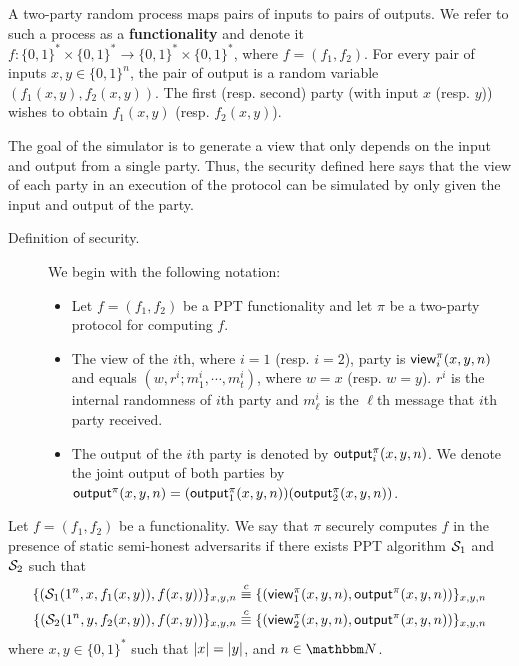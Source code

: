 \begin{definition} A two-party random process maps pairs of inputs to pairs of outputs. We refer to such a process as a {\bf functionality} and denote it $f:\{0,1\}^*\times\{0,1\}^*\to\{0,1\}^*\times\{0,1\}^*$, where $f=(f_1,f_2)$. For every pair of inputs $x,y\in\{0,1\}^n$, the pair of output is a random variable $(f_1(x,y),f_2(x,y))$. The first (resp. second) party (with input $x$ (resp. $y$)) wishes to obtain $f_1(x,y)$ (resp. $f_2(x,y)$).
\end{definition}
The goal of the simulator is to generate a view that only depends on the input and output from a single party. Thus, the security defined here says that the view of each party in an execution of the protocol can be simulated by only given the input and output of the party.
\begin{description}
\item[Definition of security.] We begin with the following notation:
\begin{itemize}[leftmargin=0em]
    \item Let $f=(f_1,f_2)$ be a PPT functionality and let $\pi$ be a two-party protocol for computing $f$.
    \item The view of the $i$th, where $i=1$ (resp. $i=2$), party is ${\sf view}^\pi_i(x,y,n)$ and equals $(w,r^i;m^i_1,\cdots,m^i_t)$, where $w=x$ (resp. $w=y$). $r^i$ is the internal randomness of $i$th party and $m^i_\ell$ is the $\ell$th message that $i$th party received.
    \item The output of the $i$th party is denoted by ${\sf output}^\pi_i(x,y,n)$. We denote the joint output of both parties by ${\sf output}^\pi(x,y,n)=({\sf output}^\pi_1(x,y,n))({\sf output}^\pi_2(x,y,n))$.
\end{itemize}
\end{description}
\begin{definition}Let $f=(f_1,f_2)$ be a functionality. We say that {\sf$\pi$ securely computes $f$ in the presence of static semi-honest adversarits} if there exists PPT algorithm $\mathcal{S}_1$ and $\mathcal{S}_2$ such that
\begin{align*}
    \{(\mathcal{S}_1(1^n,x,f_1(x,y)), f(x,y))\}_{x,y,n} \stackrel{c}{\equiv} \{({\sf view}^\pi_1(x,y,n),{\sf output}^\pi(x,y,n))\}_{x,y,n} \\
    \{(\mathcal{S}_2(1^n,y,f_2(x,y)), f(x,y))\}_{x,y,n} \stackrel{c}{\equiv} \{({\sf view}^\pi_2(x,y,n),{\sf output}^\pi(x,y,n))\}_{x,y,n}
\end{align*}
where $x,y\in\{0,1\}^*$ such that $\left|x\right| = \left|y\right|$, and $n\in\N$.
\end{definition}
